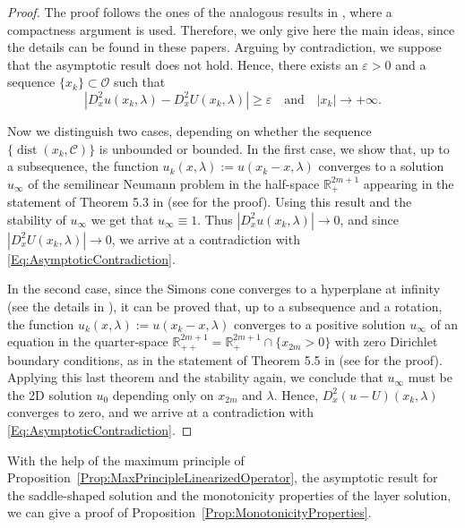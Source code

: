 \documentclass[12pt,reqno]{amsart}
\theoremstyle{definition}
\theoremstyle{remark}
\newcommand{\con}[1]{\mathbb{#1}}
\newcommand{\R}{\con{R}} %
\newcommand{\ccal}{\mathscr{C}}
\newcommand{\ocal}{\mathcal{O}}
\DeclareMathOperator{\dist}{dist}
\numberwithin{equation}{section}
\begin{document}
\begin{proof}
The proof follows the ones of the analogous results in \cite{Cinti-Saddle2,Cabre-Saddle,CabreTerraII}, where a compactness argument is used. Therefore, we only give here the main ideas, since the details can be found in these papers. Arguing by contradiction, we suppose that the asymptotic result does not hold. Hence, there exists an $\varepsilon>0$ and a sequence $\{x_k\}\subset \ocal$ such that 
\begin{equation}
	\label{Eq:AsymptoticContradiction}
|D^2_x u(x_k,\lambda)-D^2_xU(x_k,\lambda)| \geq \varepsilon \ \ \ \text{ and } \ \ \ |x_k|\to+\infty. 
\end{equation}

Now we distinguish two cases, depending on whether the sequence $\{ \dist(x_k, \ccal) \}$ is unbounded or bounded. In the first case, we show that, up to a subsequence, the function $u_k(x,\lambda) := u(x_k-x,\lambda)$ converges to a solution $u_\infty$ of the semilinear Neumann problem in the half-space $\R^{2m+1}_+$ appearing in the statement of Theorem 5.3 in \cite{Cinti-Saddle2} (see \cite{LiZhang} for the proof). Using this result and the stability of $u_\infty$ we get that $u_\infty \equiv 1$. Thus  $|D^2_x u(x_k,\lambda)| \to 0$, and since $|D^2_x U(x_k,\lambda)| \to 0$, we arrive at a contradiction with \eqref{Eq:AsymptoticContradiction}. 

In the second case, since the Simons cone converges to a hyperplane at infinity (see the details in \cite{CabreTerraII}), it can be proved that, up to a subsequence and a rotation, the function $u_k(x,\lambda) := u(x_k-x,\lambda)$ converges to a positive solution $u_\infty$ of an equation in the quarter-space $\R^{2m+1}_{++} = \R^{2m+1}_{+} \cap \{x_{2m}>0\} $ with zero Dirichlet boundary conditions, as in the statement of Theorem 5.5 in \cite{Cinti-Saddle2} (see \cite{Tan} for the proof). Applying this last theorem and the stability again, we conclude that $u_\infty$ must be the 2D solution $u_0$ depending only on $x_{2m}$ and $\lambda$. Hence, $D^2_x(u-U)(x_k,\lambda)$ converges to zero, and we arrive at a contradiction with \eqref{Eq:AsymptoticContradiction}.
\end{proof}

With the help of the maximum principle of Proposition~\ref{Prop:MaxPrincipleLinearizedOperator}, the asymptotic result for the saddle-shaped solution and the monotonicity properties of the layer solution, we can give a proof of Proposition~\ref{Prop:MonotonicityProperties}.
\end{document}
